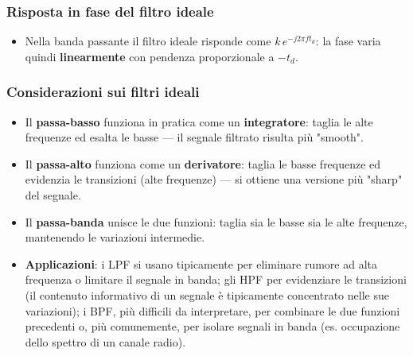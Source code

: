 \documentclass[12pt, a4paper]{article}
\begin{document}
\subsubsection{Risposta in fase del filtro ideale}
\begin{itemize}
    \item Nella banda passante il filtro ideale risponde come $k\,e^{-j2\pi ft_d}$: la fase varia quindi \textbf{linearmente} con pendenza proporzionale a $-t_d$.
\end{itemize}

\subsubsection{Considerazioni sui filtri ideali}
\begin{itemize}
    \item Il \textbf{passa-basso} funziona in pratica come un \textbf{integratore}: taglia le alte frequenze ed esalta le basse — il segnale filtrato risulta più "smooth".
    \item Il \textbf{passa-alto} funziona come un \textbf{derivatore}: taglia le basse frequenze ed evidenzia le transizioni (alte frequenze) — si ottiene una versione più "sharp" del segnale.
    \item Il \textbf{passa-banda} unisce le due funzioni: taglia sia le basse sia le alte frequenze, mantenendo le variazioni intermedie.
    \item \textbf{Applicazioni}: i LPF si usano tipicamente per eliminare rumore ad alta frequenza o limitare il segnale in banda; gli HPF per evidenziare le transizioni (il contenuto informativo di un segnale è tipicamente concentrato nelle sue variazioni); i BPF, più difficili da interpretare, per combinare le due funzioni precedenti o, più comunemente, per isolare segnali in banda (es. occupazione dello spettro di un canale radio).
\end{itemize}
\end{document}
